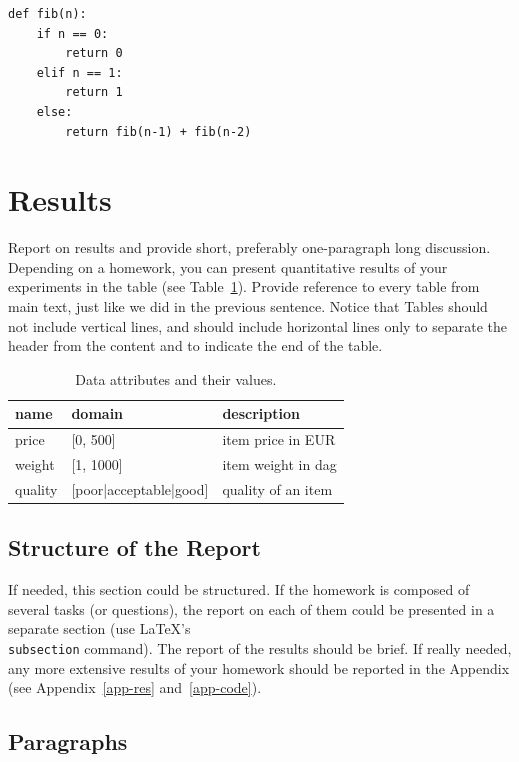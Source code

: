 \documentclass[a4paper,11pt]{article}
\begin{document}
\begin{lstlisting}
def fib(n):
    if n == 0:
        return 0
    elif n == 1:
        return 1
    else:
        return fib(n-1) + fib(n-2)
\end{lstlisting}

\section{Results}

Report on results and provide short, preferably one-paragraph long discussion. Depending on a homework, you can present quantitative results of your experiments in the table (see Table~\ref{tab1}). Provide reference to every table from main text, just like we did in the previous sentence. Notice that Tables should not include vertical lines, and should include horizontal lines only to separate the header from the content and to indicate the end of the table.

\begin{table}[htbp]
\caption{Data attributes and their values.}
\label{tab1}
\begin{center}
\begin{tabular}{llp{4cm}}
\hline
name & domain  & description \\
\hline
price & [0, 500] & item price in EUR\\
weight & [1, 1000] & item weight in dag \\
quality & [poor|acceptable|good] & quality of an item \\
\hline
\end{tabular}
\end{center}
\end{table}

\subsection{Structure of the Report}

If needed, this section could be structured. If the homework is composed of several tasks (or questions), the report on each of them could be presented in a separate section (use \LaTeX's {\tt \\subsection} command). The report of the results should be brief. If really needed, any  more extensive results of your homework should be reported in the Appendix (see Appendix~\ref{app-res} and~\ref{app-code}).

\subsection{Paragraphs}
\end{document}
